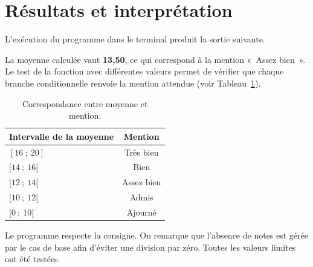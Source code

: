 \section{Résultats et interprétation}

L'exécution du programme dans le terminal produit la sortie suivante.


La moyenne calculée vaut \textbf{13{,}50}, ce qui correspond à la mention
«~Assez bien~». Le test de la fonction  avec différentes
valeurs permet de vérifier que chaque branche conditionnelle renvoie la
mention attendue (voir Tableau~\ref{tab:mentions}).

\begin{table}[h]
  \centering
  \begin{tabularx}{0.75\linewidth}{@{}Xc@{}}
    \toprule
    \textbf{Intervalle de la moyenne} & \textbf{Mention} \\
    \midrule
    $[16~;~20]$   & Très bien  \\
    $[14~;~16[$   & Bien       \\
    $[12~;~14[$   & Assez bien \\
    $[10~;~12[$   & Admis      \\
    $[0~;~10[$    & Ajourné    \\
    \bottomrule
  \end{tabularx}
  \caption{Correspondance entre moyenne et mention.}
  \label{tab:mentions}
\end{table}

\begin{remarque}[Interprétation]
Le programme respecte la consigne. On remarque que l'absence de notes est
gérée par le cas de base  afin d'éviter une division par
zéro. Toutes les valeurs limites ont été testées.
\end{remarque}
